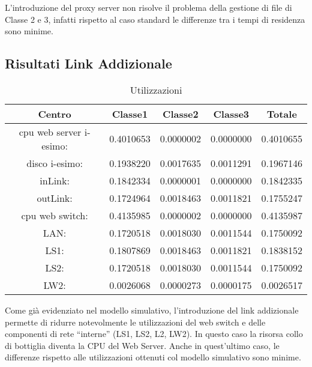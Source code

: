 L'introduzione del proxy server non risolve il problema della gestione di file di Classe 2 e 3, infatti rispetto al caso standard le differenze tra i tempi di residenza sono minime.
\subsection{Risultati Link Addizionale}
\begin{table}[H]
\begin{center}
\begin{tabular}{||c|c|c|c|c||}
\hline
Centro &Classe1 &Classe2 &Classe3 &Totale\\
\hline
\hline
 cpu web server i-esimo: 	&0.4010653	&0.0000002	&0.0000000	&0.4010655	\\\hline
 disco i-esimo: 	&0.1938220	&0.0017635	&0.0011291	&0.1967146	\\\hline
 inLink: 	&0.1842334	&0.0000001	&0.0000000	&0.1842335	\\\hline
 outLink: 	&0.1724964	&0.0018463	&0.0011821	&0.1755247	\\\hline
 cpu web switch: 	&0.4135985	&0.0000002	&0.0000000	&0.4135987	\\\hline
 LAN: 	&0.1720518	&0.0018030	&0.0011544	&0.1750092	\\\hline
 LS1: 	&0.1807869	&0.0018463	&0.0011821	&0.1838152	\\\hline
 LS2:	&0.1720518	&0.0018030	&0.0011544	&0.1750092	\\\hline
 LW2: 	&0.0026068	&0.0000273	&0.0000175	&0.0026517	\\\hline
\end{tabular}
\end{center}
\caption{Utilizzazioni}
\label{utilizzazioni}
\end{table}
Come già evidenziato nel modello simulativo, l'introduzione del link addizionale permette di ridurre notevolmente le utilizzazioni del web switch e delle componenti di rete “interne” (LS1, LS2, L2, LW2). In questo caso la risorsa collo di bottiglia diventa la CPU del Web Server. Anche in quest'ultimo caso, le differenze rispetto alle utilizzazioni  ottenuti col modello simulativo sono minime.
